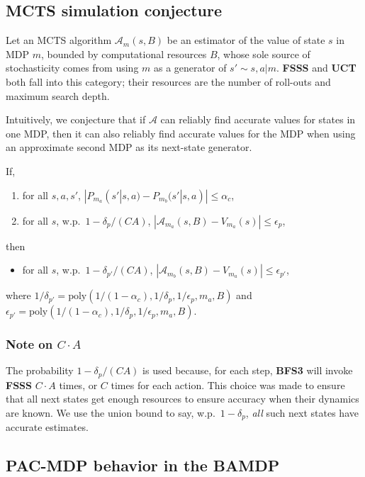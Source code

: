 \subsection{MCTS simulation conjecture}
\label{mcts-conj}

Let an MCTS algorithm $\mathcal{A}_m(s,B)$ be an estimator of the value of state $s$ in MDP $m$, bounded by computational resources $B$, whose sole source of stochasticity comes from using $m$ as a generator of $s'\sim s,a|m$. {\bf FSSS} and {\bf UCT}~\cite{kocsis06} both fall into this category; their resources are the number of roll-outs and maximum search depth.

Intuitively, we conjecture that if $\mathcal{A}$ can reliably find accurate values for states in one MDP, then it can also reliably find accurate values for the MDP when using an approximate second MDP as its next-state generator.

If,
\begin{enumerate}
\item \label{mcts-bound} for all $s,a,s'$, $|P_{m_a}(s'|s,a) - P_{m_b}(s'|s,a)| \leq \alpha_c$,
\item \label{mcts-good} for all $s$, w.p.\ $1-\delta_p/(CA)$, $|\mathcal{A}_{m_a}(s,B)-V_{m_a}(s)|\leq \epsilon_p$,
\end{enumerate}
then
\begin{itemize}
\item for all $s$, w.p.\ $1-\delta_{p'}/(CA)$, $|\mathcal{A}_{m_b}(s,B)-V_{m_a}(s)|\leq \epsilon_{p'}$,
\end{itemize}
where $1/\delta_{p'}=\mbox{poly}(1/(1-\alpha_c),1/\delta_p,1/\epsilon_p,m_a,B)$ and $\epsilon_{p'}=\mbox{poly}(1/(1-\alpha_c),1/\delta_p,1/\epsilon_p,m_a,B)$.

\subsubsection{Note on $C \cdot A$}
The probability $1-\delta_{p}/(CA)$ is used because, for each step, {\bf BFS3} will invoke {\bf FSSS} $C \cdot A$ times, or $C$ times for each action.  This choice was made to ensure that all next states get enough resources to ensure accuracy when their dynamics are known. We use the union bound to say, w.p.\ $1-\delta_p$, \emph{all} such next states have accurate estimates.

\subsection{PAC-MDP behavior in the BAMDP}

